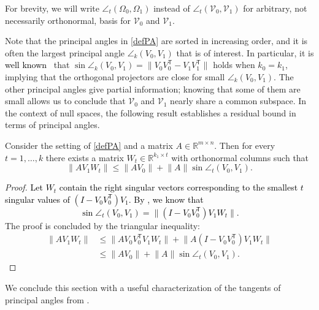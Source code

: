 \documentclass{siamart190516}
\newcommand{\Ttran}{\mathsf{T}}
\newcommand{\R}{\mathbb{R}}
\providecommand{\norm}[1]{\lVert#1\rVert}
\newcommand{\edit}[1]{\textcolor{black}{#1}} %
\newcommand{\redit}[1]{\textcolor{black}{#1}} %
\begin{document}
For brevity, we will write $\angle_{t}(\Omega_{0},\Omega_{1})$ instead of $\angle_{t}(\mathcal{V}_{0},\mathcal{V}_{1})$ for arbitrary, not necessarily orthonormal, basis for $\mathcal{V}_{0}$ and $\mathcal{V}_{1}$.


Note that the principal angles in \cref{defPA} are sorted in increasing order, and it is often the largest principal angle $\angle_{k}(V_{0},V_{1})$ that is of interest. In particular, it is \redit{well known~\cite[Corollary II.4.6]{Stewart1990}} that
$\sin \angle_{k}(V_{0},V_{1}) = \norm{V_{0}V_{0}^{\Ttran}-V_{1}V_{1}^{\Ttran}}$
holds when $k_{0}=k_{1}$, implying that the orthogonal projectors are close for small $\angle_{k}(V_{0},V_{1})$.  
The other principal angles give partial information; knowing that some of them are small allows us to conclude that $\mathcal{V}_{0}$ and $\mathcal{V}_{1}$ nearly share a common subspace. In the context of null spaces, the following result establishes a residual bound in terms of principal angles.
\begin{proposition}
    \label{corWt}
    Consider the setting of \cref{defPA} and a  matrix $A\in\R^{m \times n}$. Then for every $t = 1,\dotsc, k$ there exists a matrix $W_{t}\in\R^{k_{1}\times t}$ with orthonormal columns such that 
    \begin{equation*}
        \norm{AV_{1}W_{t}} \leq \norm{AV_{0}}+\norm{A}\sin\angle_{t}(V_{0},V_{1}).
    \end{equation*}
\end{proposition}
\begin{proof}
    \edit{Let $W_{t}$ contain the right singular vectors corresponding to the smallest $t$ singular values of $(I-V_{0}V_{0}^{\Ttran})V_{1}$. By \cite[Chap.~1, Thm.~4.37]{Stewart1998}, we know that 
    \begin{equation*}
        \sin\angle_{t}(V_{0},V_{1}) = \norm{(I-V_{0}V_{0}^{\Ttran})V_{1}W_{t}}.
    \end{equation*}
    }
    The proof is concluded by the triangular inequality:
    \begin{equation*}
        \begin{aligned}
            \norm{AV_{1}W_{t}} &\leq \norm{AV_{0}V_{0}^{\Ttran}V_{1}W_{t}}+\norm{A(I-V_{0}V_{0}^{\Ttran})V_{1}W_{t}}\\ 
            &\leq \norm{AV_{0}}+\norm{A}\sin\angle_{t}(V_{0},V_{1}).
        \end{aligned}
    \end{equation*}
\end{proof}
We conclude this section with a useful characterization of the tangents of principal angles from \cite[Theorem~3.1]{Zhu2013}.
\end{document}

